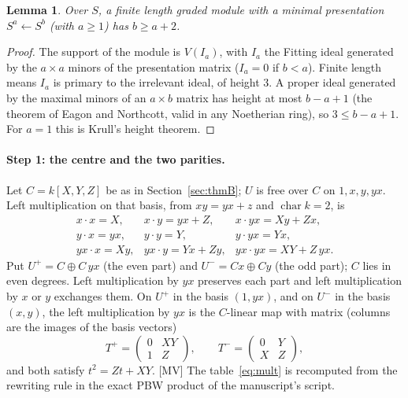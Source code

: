 \documentclass[11pt]{article}
\newtheorem{lemma}{Lemma}
\theoremstyle{definition}
\theoremstyle{remark}
\begin{document}
\begin{lemma}\label{lem:krull}
Over $S$, a finite length graded module with a minimal presentation $S^a\leftarrow S^b$ (with $a\ge1$) has $b\ge a+2$.
\end{lemma}
\begin{proof}
The support of the module is $V(I_a)$, with $I_a$ the Fitting ideal generated by the $a\times a$ minors of the presentation matrix ($I_a=0$ if $b<a$). Finite length means $I_a$ is primary to the irrelevant ideal, of height $3$. A proper ideal generated by the maximal minors of an $a\times b$ matrix has height at most $b-a+1$ (the theorem of Eagon and Northcott, valid in any Noetherian ring), so $3\le b-a+1$. For $a=1$ this is Krull's height theorem.
\end{proof}

\paragraph{Step 1: the centre and the two parities.} Let $C=k[X,Y,Z]$ be as in Section~\ref{sec:thmB}; $U$ is free over $C$ on $1,x,y,yx$. Left multiplication on that basis, from $xy=yx+z$ and $\operatorname{char}k=2$, is
\begin{equation}\label{eq:mult}
\begin{array}{lll}
x\cdot x=X,&x\cdot y=yx+Z,&x\cdot yx=Xy+Zx,\\
y\cdot x=yx,&y\cdot y=Y,&y\cdot yx=Yx,\\
yx\cdot x=Xy,&yx\cdot y=Yx+Zy,&yx\cdot yx=XY+Z\,yx.
\end{array}
\end{equation}
Put $U^+=C\oplus C\,yx$ (the even part) and $U^-=Cx\oplus Cy$ (the odd part); $C$ lies in even degrees. Left multiplication by $yx$ preserves each part and left multiplication by $x$ or $y$ exchanges them. On $U^+$ in the basis $(1,yx)$, and on $U^-$ in the basis $(x,y)$, the left multiplication by $yx$ is the $C$-linear map with matrix (columns are the images of the basis vectors)
\begin{equation}\label{eq:Tpm}
T^+=\begin{pmatrix}0&XY\\1&Z\end{pmatrix},\qquad T^-=\begin{pmatrix}0&Y\\X&Z\end{pmatrix},
\end{equation}
and both satisfy $t^2=Zt+XY$. [MV] The table~\eqref{eq:mult} is recomputed from the rewriting rule in the exact PBW product of the manuscript's script.
\end{document}
